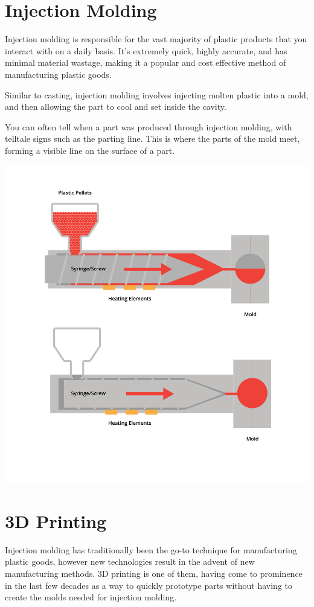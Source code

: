 \section{Injection Molding}

Injection molding is responsible for the vast majority of plastic products that you interact with on a daily basis. It’s extremely quick, highly accurate, and has minimal material wastage, making it a popular and cost effective method of manufacturing plastic goods.

Similar to casting, injection molding involves injecting molten plastic into a mold, and then allowing the part to cool and set inside the cavity. 

You can often tell when a part was produced through injection molding, with telltale signs such as the parting line. This is where the parts of the mold meet, forming a visible line on the surface of a part.

\includegraphics[width=.75\textwidth]{injectionMolding.png}



\section{3D Printing}

Injection molding has traditionally been the go-to technique for manufacturing plastic goods, however new technologies result in the advent of new manufacturing methods. 3D printing is one of them, having come to prominence in the last few decades as a way to quickly prototype parts without having to create the molds needed for injection molding.

